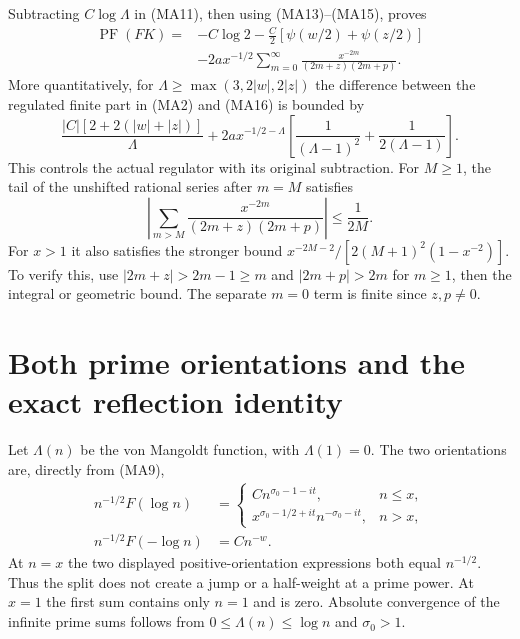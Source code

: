 \documentclass[11pt]{article}
\newcommand{\PF}{\operatorname{PF}}\newcommand{\dd}{\,d}
\begin{document}
Subtracting $C\log\Lambda$ in (MA11), then using (MA13)--(MA15), proves
\begin{equation}\tag{MA16}\boxed{\begin{aligned}
 \PF(FK)={}&-C\log2
 -\frac C2[\psi(w/2)+\psi(z/2)]\\
 &-2a x^{-1/2}\sum_{m=0}^\infty
       \frac{x^{-2m}}{(2m+z)(2m+p)}.
\end{aligned}}\end{equation}
More quantitatively, for
$\Lambda\ge\max(3,2|w|,2|z|)$ the difference between the regulated finite
part in (MA2) and (MA16) is bounded by
\begin{equation}\tag{MA17}
 \frac{|C|[2+2(|w|+|z|)]}{\Lambda}
 +2a x^{-1/2-\Lambda}
 \left[\frac1{(\Lambda-1)^2}+\frac1{2(\Lambda-1)}\right].
\end{equation}
This controls the actual regulator with its original subtraction.
For $M\ge1$, the tail of the unshifted rational series after $m=M$ satisfies
\begin{equation}\tag{MA18}
 \left|\sum_{m>M}\frac{x^{-2m}}{(2m+z)(2m+p)}\right|
 \le\frac1{2M}.
\end{equation}
For $x>1$ it also satisfies the stronger bound
$x^{-2M-2}/[2(M+1)^2(1-x^{-2})]$.
To verify this, use $|2m+z|>2m-1\ge m$ and $|2m+p|>2m$ for $m\ge1$,
then the integral or geometric bound. The separate $m=0$ term is finite
since $z,p\ne0$.

\section{Both prime orientations and the exact reflection identity}
Let $\Lambda(n)$ be the von Mangoldt function, with $\Lambda(1)=0$.
The two orientations are, directly from (MA9),
\begin{equation}\tag{MA19}\begin{aligned}
 n^{-1/2}F(\log n)
 &=\begin{cases}
 Cn^{\sigma_0-1-it},& n\le x,\\
 x^{\sigma_0-1/2+it}n^{-\sigma_0-it},& n>x,
 \end{cases}\\
 n^{-1/2}F(-\log n)&=Cn^{-w}.
\end{aligned}\end{equation}
At $n=x$ the two displayed positive-orientation expressions both equal
$n^{-1/2}$. Thus the split does not create a jump or a half-weight at
a prime power. At $x=1$ the first sum contains only $n=1$ and is zero.
Absolute convergence of the infinite prime sums follows from
$0\le\Lambda(n)\le\log n$ and $\sigma_0>1$.
\end{document}
